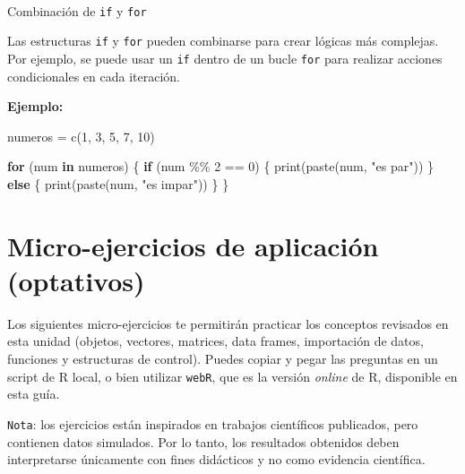 \documentclass[
  spanish,
  letterpaper,
  DIV=11,
  numbers=noendperiod]{scrreprt}
\makeatletter
\let\oldparagraph\paragraph
\renewcommand{\paragraph}{
    \@ifstar
      \xxxParagraphStar
      \xxxParagraphNoStar
  }
\newcommand{\xxxParagraphStar}[1]{\oldparagraph*{#1}\mbox{}}
\newcommand{\xxxParagraphNoStar}[1]{\oldparagraph{#1}\mbox{}}
\newenvironment{Shaded}{\begin{snugshade}}{\end{snugshade}}
\newcommand{\ControlFlowTok}[1]{\textcolor[rgb]{0.00,0.23,0.31}{\textbf{#1}}}
\newcommand{\DecValTok}[1]{\textcolor[rgb]{0.68,0.00,0.00}{#1}}
\newcommand{\FunctionTok}[1]{\textcolor[rgb]{0.28,0.35,0.67}{#1}}
\newcommand{\NormalTok}[1]{\textcolor[rgb]{0.00,0.23,0.31}{#1}}
\newcommand{\OtherTok}[1]{\textcolor[rgb]{0.00,0.23,0.31}{#1}}
\newcommand{\SpecialCharTok}[1]{\textcolor[rgb]{0.37,0.37,0.37}{#1}}
\newcommand{\StringTok}[1]{\textcolor[rgb]{0.13,0.47,0.30}{#1}}
\makeatother
\begin{document}
\paragraph{\texorpdfstring{Combinación de \texttt{if} y
\texttt{for}}{Combinación de if y for}}\label{combinaciuxf3n-de-if-y-for}

Las estructuras \texttt{if} y \texttt{for} pueden combinarse para crear
lógicas más complejas. Por ejemplo, se puede usar un \texttt{if} dentro
de un bucle \texttt{for} para realizar acciones condicionales en cada
iteración.

\textbf{Ejemplo:}

\begin{Shaded}
\begin{Highlighting}[]
\NormalTok{numeros }\OtherTok{=} \FunctionTok{c}\NormalTok{(}\DecValTok{1}\NormalTok{, }\DecValTok{3}\NormalTok{, }\DecValTok{5}\NormalTok{, }\DecValTok{7}\NormalTok{, }\DecValTok{10}\NormalTok{)}

\ControlFlowTok{for}\NormalTok{ (num }\ControlFlowTok{in}\NormalTok{ numeros) \{}
  \ControlFlowTok{if}\NormalTok{ (num }\SpecialCharTok{\%\%} \DecValTok{2} \SpecialCharTok{==} \DecValTok{0}\NormalTok{) \{}
    \FunctionTok{print}\NormalTok{(}\FunctionTok{paste}\NormalTok{(num, }\StringTok{"es par"}\NormalTok{))}
\NormalTok{  \} }\ControlFlowTok{else}\NormalTok{ \{}
    \FunctionTok{print}\NormalTok{(}\FunctionTok{paste}\NormalTok{(num, }\StringTok{"es impar"}\NormalTok{))}
\NormalTok{  \}}
\NormalTok{\}}
\end{Highlighting}
\end{Shaded}

\section{Micro-ejercicios de aplicación
(optativos)}\label{micro-ejercicios-de-aplicaciuxf3n-optativos}

Los siguientes micro-ejercicios te permitirán practicar los conceptos
revisados en esta unidad (objetos, vectores, matrices, data frames,
importación de datos, funciones y estructuras de control). Puedes copiar
y pegar las preguntas en un script de R local, o bien utilizar
\texttt{webR}, que es la versión \emph{online} de R, disponible en esta
guía.

\texttt{Nota}: los ejercicios están inspirados en trabajos científicos
publicados, pero contienen datos simulados. Por lo tanto, los resultados
obtenidos deben interpretarse únicamente con fines didácticos y no como
evidencia científica.
\end{document}

